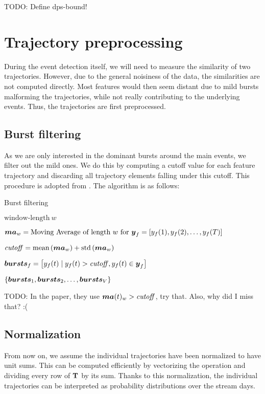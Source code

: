 {\color{red}TODO: Define dps-bound!}


\section{Trajectory preprocessing}
During the event detection itself, we will need to measure the similarity of two trajectories. However, due to the general noisiness of the data, the similarities are not computed directly. Most features would then seem distant due to mild bursts malforming the trajectories, while not really contributing to the underlying events. Thus, the trajectories are first preprocessed.

\subsection{Burst filtering}
As we are only interested in the dominant bursts around the main events, we filter out the mild ones. We do this by computing a cutoff value for each feature trajectory and discarding all trajectory elements falling under this cutoff. This procedure is adopted from \cite{online-search-queries}. The algorithm is as follows:

\begin{algorithm}[H]
\begin{algorithmic}[1]
\caption{Burst filtering}
\Input $\text{window-length} ~ w$

	\State $\vect{MA}_{w} = \text{Moving Average of length} ~ w ~ \text{for} ~ \vect{\traj}_{f} = \left[ \traj_{f}(1), \traj_{f}(2), \dots, \traj_{f}(\streamlen) \right]$

	\State $\mathit{cutoff} = \text{mean} \left( \vect{MA}_{w} \right) + \text{std} \left( \vect{MA}_{w} \right)$

	\State $\vect{bursts}_{f} = \left[ \traj_{f}(t) \mid \traj_{f}(t) > \mathit{cutoff}, \traj_{f}(t) \in \vect{y}_{f} \right]$
\EndFor

\Output $\{ \vect{bursts}_{1}, \vect{bursts}_{2}, \dots, \vect{bursts}_{\featcount} \}$
\end{algorithmic}
\end{algorithm}

{\color{red} TODO: In the paper, they use $\vect{MA}(t)_{w} > \mathit{cutoff}$, try that. Also, why did I miss that? :(}

\subsection{Normalization}
From now on, we assume the individual trajectories have been normalized to have unit sums. This can be computed efficiently by vectorizing the operation and dividing every row of $\mathbf{T}$ by its sum. Thanks to this normalization, the individual trajectories can be interpreted as probability distributions over the stream days.

